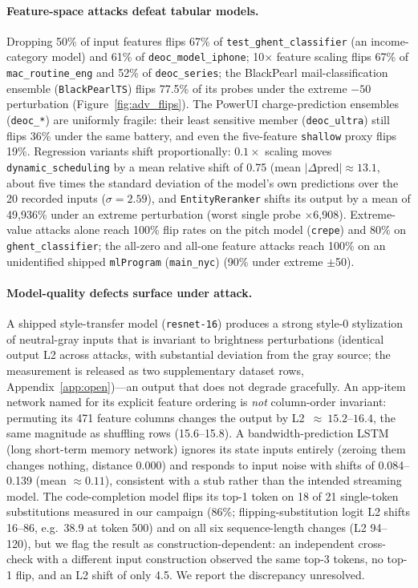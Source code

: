 \documentclass[letterpaper,twocolumn,10pt]{article}
\newcommand{\mlprogram}{\texttt{mlProgram}\xspace}
\begin{document}
\paragraph{Feature-space attacks defeat tabular models.}
Dropping 50\% of input features flips 67\% of \texttt{test\_ghent\_classifier}
(an income-category model) and 61\% of \texttt{deoc\_model\_iphone};
10$\times$ feature scaling flips 67\% of \texttt{mac\_routine\_eng} and 52\%
of \texttt{deoc\_series}; the BlackPearl mail-classification ensemble
(\texttt{BlackPearlTS}) flips 77.5\% of its probes under the extreme $-50$
perturbation (Figure~\ref{fig:adv_flips}).
The PowerUI charge-prediction ensembles (\texttt{deoc\_*}) are uniformly
fragile: their least sensitive member (\texttt{deoc\_ultra}) still flips
36\% under the same battery, and even the five-feature \texttt{shallow}
proxy flips 19\%.
Regression variants shift proportionally: $0.1\times$ scaling moves
\texttt{dynamic\_scheduling} by a mean relative shift of 0.75 (mean
$|\Delta\text{pred}|\approx 13.1$, about five times the standard deviation
of the model's own predictions over the 20 recorded inputs
($\sigma=2.59$), and \texttt{EntityReranker} shifts its output by a mean of
49{,}936\% under an extreme perturbation (worst single probe
$\times$6{,}908).
Extreme-value attacks alone reach 100\% flip rates on the pitch model
(\texttt{crepe}) and 80\% on \texttt{ghent\_classifier}; the all-zero and
all-one feature attacks reach 100\% on an unidentified shipped
\mlprogram{} (\texttt{main\_nyc}) (90\% under extreme $\pm$50).

\paragraph{Model-quality defects surface under attack.}
A shipped style-transfer model (\texttt{resnet-16}) produces a strong
style-0 stylization of neutral-gray inputs that is invariant to
brightness perturbations (identical output L2 across attacks, with
substantial deviation from the gray source; the measurement is released as
two supplementary dataset rows, Appendix~\ref{app:open})---an output that
does not degrade gracefully.
An app-item network named for its explicit feature ordering is
\emph{not} column-order invariant: permuting its 471 feature columns changes
the output by L2~${\approx}~15.2$--$16.4$, the same magnitude as shuffling
rows (15.6--15.8).
A bandwidth-prediction LSTM (long short-term memory network) ignores its
state inputs entirely (zeroing them changes nothing, distance 0.000) and
responds to input noise with shifts of 0.084--0.139 (mean
${\approx}0.11$), consistent with a stub rather than the intended streaming
model.
The code-completion model flips its top-1 token on 18 of 21 single-token
substitutions measured in our campaign (86\%; flipping-substitution logit
L2 shifts 16--86, e.g.\ 38.9 at token 500) and on all six sequence-length
changes (L2 94--120), but we flag the result as
construction-dependent: an independent cross-check with a different input
construction observed the same top-3 tokens, no top-1 flip, and an L2 shift
of only 4.5. We report the discrepancy unresolved.
\end{document}
